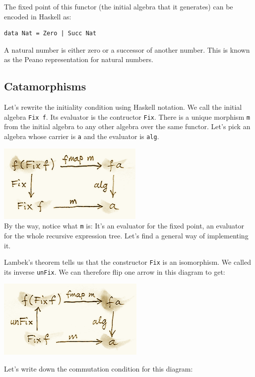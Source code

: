 The fixed point of this functor (the initial algebra that it generates)
can be encoded in Haskell as:

\begin{verbatim}
data Nat = Zero | Succ Nat
\end{verbatim}

A natural number is either zero or a successor of another number. This
is known as the Peano representation for natural numbers.

\subsection{Catamorphisms}\label{catamorphisms}

Let's rewrite the initiality condition using Haskell notation. We call
the initial algebra \texttt{Fix\ f}. Its evaluator is the contructor
\texttt{Fix}. There is a unique morphism \texttt{m} from the initial
algebra to any other algebra over the same functor. Let's pick an
algebra whose carrier is \texttt{a} and the evaluator is \texttt{alg}.

\includegraphics{images/alg5.png}\\
By the way, notice what \texttt{m} is: It's an evaluator for the fixed
point, an evaluator for the whole recursive expression tree. Let's find
a general way of implementing it.

Lambek's theorem tells us that the constructor \texttt{Fix} is an
isomorphism. We called its inverse \texttt{unFix}. We can therefore flip
one arrow in this diagram to get:

\includegraphics{images/alg6.png}

Let's write down the commutation condition for this diagram:

